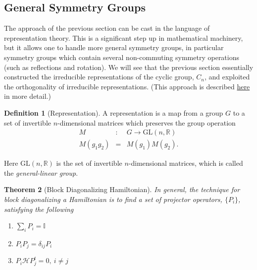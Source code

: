 \documentclass{article}
\newtheorem{theorem}{Theorem}[section]
\theoremstyle{definition}
\newtheorem{definition}[theorem]{Definition}
\begin{document}
\subsection{General Symmetry Groups}
The approach of the previous section can be cast in the language of representation theory. This is a significant step up in mathematical machinery, but it allows one to handle more general symmetry groups, in particular symmetry groups which contain several non-commuting symmetry operations (such as reflections and rotation). We will see that the previous section essentially constructed the irreducible representations of the cyclic group, $C_n$, and exploited the orthogonality of irreducible representations. (This approach is described \href{http://www.phys.hawaii.edu/~yepez/Spring2013/lectures/Lecture8_Hubbard_Model_Notes.pdf}{here} in more detail.)

\begin{definition}[Representation]
A representation is a map from a group $G$ to a set of invertible $n$-dimensional matrices which preserves the group operation
\begin{eqnarray}
M &:& G \rightarrow \text{GL}(n, \mathbb{R})\\
M(g_1 g_2) &=& M(g_1) M(g_2).
\end{eqnarray}

Here $\text{GL}(n, \mathbb{R})$ is the set of invertible $n$-dimensional matrices, which is called the \emph{general-linear group}.
\end{definition}

\begin{theorem}[Block Diagonalizing Hamiltonian]
\label{proj-props}
In general, the technique for block diagonalizing a Hamiltonian is to find a set of projector operators, $\{P_i\}$, satisfying the following
\begin{enumerate}
\item $\sum_i P_i = \mathbb{I}$
\item $P_i P_j = \delta_{ij} P_i$
\item $P_i \mathcal{H} P_j^t = 0, \ i \neq j$
\end{enumerate}
\end{theorem}
\end{document}
